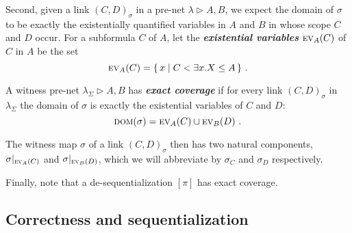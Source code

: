 \documentclass[UKenglish]{lipics-v2016}
\theoremstyle{plain}
\newcommand\defn[1]{\textit{\textbf{#1}}}
\newcommand\ex[2][{}]{\textsc{ev}_{#1}(#2)}
\newcommand\dom[1]{\textsc{dom}(#1)}
\newcommand\+{+}
\renewcommand\*{\times}
\newcommand\sub{\leq}
\newcommand\net[3]{#1\triangleright #2,#3}
\newcommand\res[1]{|_{#1}}
\newcommand\link[3][\sigma]{(#2,#3)_{#1}}
\begin{document}
Second, given a link $\link CD$ in a pre-net $\net\lambda AB$, we expect the domain of $\sigma$ to be exactly the existentially quantified variables in $A$ and $B$ in whose scope $C$ and $D$ occur. 
For a subformula $C$ of $A$, let the \defn{existential variables} $\ex[A]C$ of $C$ in $A$ be the set
\[
	\ex[A]C = \{\,x \mid C < \exists x.X \sub A\,\}~.
\]


\begin{definition}
A witness pre-net $\net{\lambda_\Sigma}AB$ has \defn{exact coverage} if for every link $\link CD$ in $\lambda_\Sigma$ the domain of $\sigma$ is exactly the existential variables of $C$ and $D$:
\[
	\dom\sigma = \ex[A]C\cup\ex[B]D~.
\]
\end{definition}
%
%
The witness map $\sigma$ of a link $\link CD$ then has two natural components, $\sigma\res{\ex[A]C}$ and $\sigma\res{\ex[B]D}$, which we will abbreviate by $\sigma_C$ and $\sigma_D$ respectively.

Finally, note that a de-sequentialization $[\pi]$ has exact coverage.




\subsection{Correctness and sequentialization}
\end{document}
